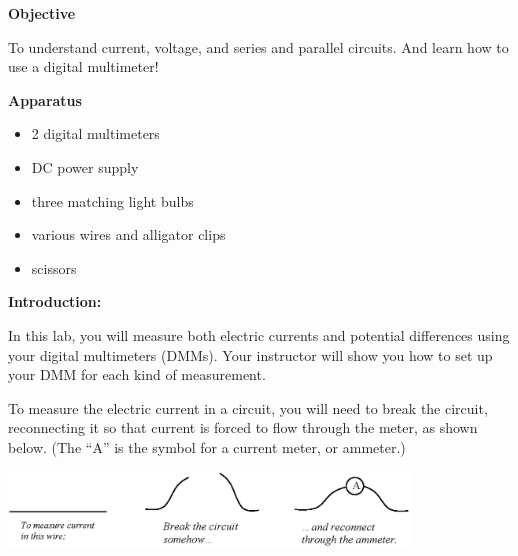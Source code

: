 \makelabheader %

\textbf{Objective}

To understand current, voltage, and series and parallel circuits.  And learn how to use a digital multimeter!

\textbf{Apparatus}

\begin{itemize} \itemsep1pt
\item 2 digital multimeters 
\item DC power supply 
\item three matching light bulbs 
\item various wires and alligator clips
\item scissors
\end{itemize}

\textbf{Introduction:}

In this lab, you will measure both electric currents and potential differences using your digital multimeters (DMMs).  Your instructor will show you how to set up your DMM for each kind of measurement.

To measure the electric current in a circuit, you will need to break the circuit, reconnecting it so that current is forced to flow through the meter, as shown below.  (The ``A'' is the symbol for a current meter, or ammeter.)

\begin{center}
\includegraphics[width=0.8\textwidth]{electric_circuits/how_to_measure_current.eps}
\end{center}
\vspace{-0.1in}

